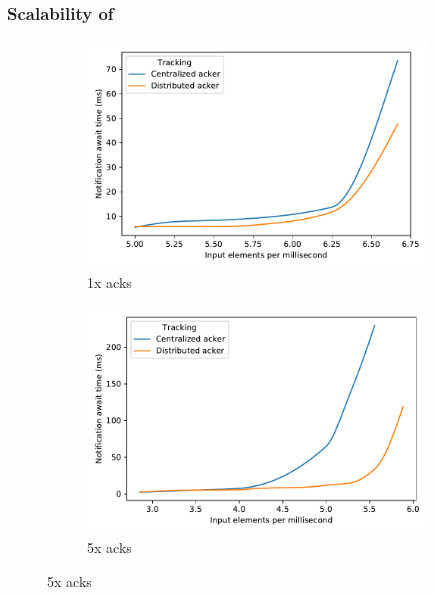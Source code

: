 \subsubsection{Scalability of \tracker }
\begin{figure}[t!]
    \begin{subfigure}[b]{0.32\textwidth}
            \includegraphics[width=0.99\textwidth]{pics/scalability_01x.pdf}
            \caption{1x acks}
            \label{1x_acks}
    \end{subfigure}
    \hspace{5mm}
    \begin{subfigure}[b]{0.32\textwidth}
            \includegraphics[width=0.99\textwidth]{pics/scalability_05x.pdf}
            \caption{5x acks}
            \label{5x_acks}
    \end{subfigure}
    \hspace{5mm}

\end{figure}
